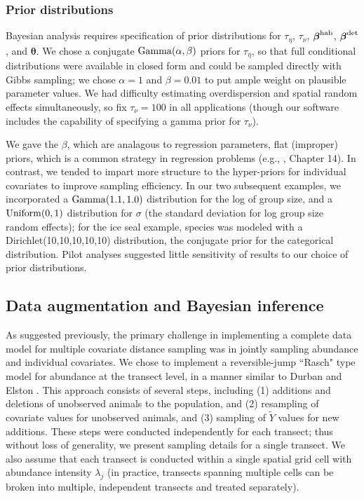 \documentclass[10pt]{article}
\begin{document}
\subsubsection*{Prior distributions}

Bayesian analysis requires specification of prior distributions for $\tau_\eta$, $\tau_\nu$, $\boldsymbol{\beta}^{\rm hab}$, $\boldsymbol{\beta}^{\rm det}$, and $\boldsymbol{\theta}$.  We chose a conjugate ${\rm Gamma}(\alpha,\beta)$ priors for $\tau_\eta$, so that full conditional distributions were available in closed form and could be sampled directly with Gibbs sampling; we chose $\alpha=1$ and $\beta=0.01$ to put ample weight on plausible parameter values. We had difficulty estimating overdispersion and spatial random effects simultaneously, so fix $\tau_\nu=100$ in all applications (though our software includes the capability of specifying a gamma prior for $\tau_\nu$).

We gave the $\beta$, which are analagous to regression parameters, flat (improper) priors, which is a common strategy in regression problems (e.g., \cite{GelmanEtAl2004}, Chapter 14).  In contrast, we tended to impart more structure to the hyper-priors for individual covariates to improve sampling efficiency.  In our two subsequent examples, we incorporated a ${\rm Gamma}(1.1,1.0)$ distribution for the log of group size, and a ${\rm Uniform}(0,1)$ distribution for $\sigma$ (the standard deviation for log group size random effects); for the ice seal example, species was modeled with a Dirichlet(10,10,10,10,10) distribution, the conjugate prior for the categorical distribution.  Pilot analyses suggested little sensitivity of results to our choice of prior distributions.

\subsection*{Data augmentation and Bayesian inference}

As suggested previously, the primary challenge in implementing a complete data model for multiple covariate distance sampling was in jointly sampling abundance and individual covariates.  We chose to implement a reversible-jump ``Rasch" type model for abundance at the transect level, in a manner similar to Durban and Elston \cite{DurbanElston2005}.  This approach consists of several steps, including (1) additions and deletions of unobserved animals to the population, and (2) resampling of covariate values for unobserved animals, and (3) sampling of $\tilde{Y}$ values for new additions. These steps were conducted independently for each transect; thus without loss of generality, we present sampling details for a single transect. We also assume that each transect is conducted within a single spatial grid cell with abundance intensity $\lambda_j$ (in practice, transects spanning multiple cells can be broken into multiple, independent transects and treated separately).
\end{document}
